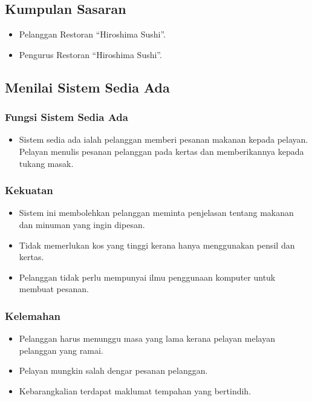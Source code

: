 \documentclass[a4paper, 12pt]{article}
\begin{document}
\subsection{Kumpulan Sasaran}

\begin{itemize}
    \item Pelanggan Restoran “Hiroshima Sushi”.
    \item Pengurus Restoran “Hiroshima Sushi”.
\end{itemize}

\subsection{Menilai Sistem Sedia Ada}

\subsubsection*{Fungsi Sistem Sedia Ada}

\begin{itemize}
    \item Sistem sedia ada ialah pelanggan memberi pesanan makanan kepada pelayan. Pelayan menulis pesanan pelanggan pada kertas dan memberikannya kepada tukang masak.
\end{itemize}

\subsubsection*{Kekuatan}

\begin{itemize}
    \item Sistem ini membolehkan pelanggan meminta penjelasan tentang makanan dan minuman yang ingin dipesan.
    \item Tidak memerlukan kos yang tinggi kerana hanya menggunakan pensil dan kertas.
    \item Pelanggan tidak perlu mempunyai ilmu penggunaan komputer untuk membuat pesanan.
\end{itemize}

\subsubsection*{Kelemahan}

\begin{itemize}
    \item Pelanggan harus menunggu masa yang lama kerana pelayan melayan pelanggan yang ramai. 
    \item Pelayan mungkin salah dengar pesanan pelanggan.
    \item Kebarangkalian terdapat maklumat tempahan yang bertindih.
\end{itemize}
\end{document}
